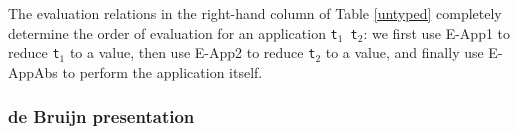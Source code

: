 \documentclass{article}
\begin{document}
The evaluation relations in the right-hand column of Table \ref{untyped} completely determine the order of evaluation for an application \texttt{t$_1$ t$_2$}: we first use E-App1 to reduce \texttt{t$_1$} to a value, then use E-App2 to reduce \texttt{t$_2$} to a value, and finally use E-AppAbs to perform the application itself.

\subsubsection{de Bruijn presentation}
\end{document}
